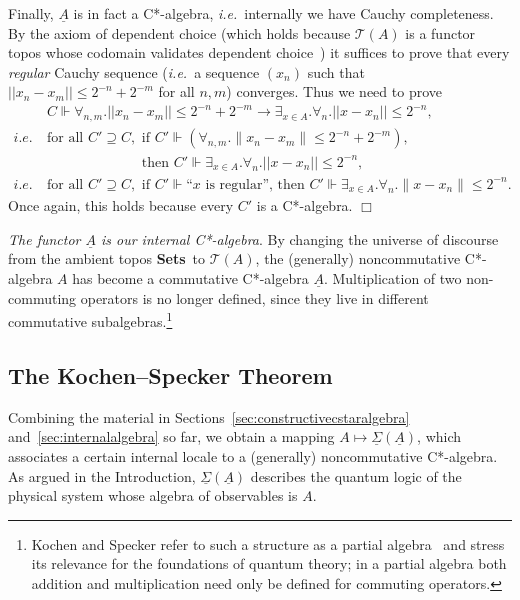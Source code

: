 \documentclass[12pt]{article}
\newcommand{\Sets}{\mbox{\textbf{Sets}}}
\newcommand{\ca}{C*-algebra} \newcommand{\jba}{JB-algebra}
\newcommand{\alg}[1]{\ensuremath{#1}}
\newcommand{\functor}[1]{\ensuremath{\underline{#1}}}
\newcommand{\asstopos}{\ensuremath{\mathcal{T}}}
\newcommand{\uA}{\underline{A}}
\newcommand{\TA}{\mathcal{T}(A)}
\newcommand{\ie}{\textit{i.e.}}
\newcommand{\ulS}{\functor{\Sigma}}
\renewcommand{\TA}{\asstopos(\alg{A})}
\newenvironment{proof}[1][Proof]%
{ \begin{trivlist}%
  \item[\hskip \labelsep {\bfseries #1}]%
}%
{ \end{trivlist}%
}
\newcommand{\qed}{\nobreak\hfill$\Box$}
\begin{document}
\begin{proof}
  Finally, $\functor{\alg{A}}$ is in fact a C*-algebra, \ie\ internally
  we have Cauchy completeness. By the axiom of dependent choice
  (which holds because $\TA$ is a functor topos whose codomain
 validates   dependent choice~\cite{fourmanscedrov82})
   it
  suffices to prove that every \emph{regular} Cauchy sequence (\ie\
 a sequence $(x_n)$ such that
  $||x_n-x_m||\leqslant 2^{-n}+2^{-m}$ for all $n,m$)   converges. Thus we need to
prove
  \begin{align*}
     & C\Vdash \forall_{n,m}. ||x_n-x_m||\leqslant
2^{-n}+2^{-m}\rightarrow \exists_{x\in
       A}. \forall_n. ||x-x_n||\leqslant 2^{-n}, \\
     \ie\ & \mbox{for all }C'\supseteq C, \mbox{ if }C'\Vdash (\forall_{n,m}.
           \|x_n-x_m\|\leqslant 2^{-n}+2^{-m}), \\
         & \phantom{\mbox{for all }C'\supseteq C, }\mbox{ then }C'\Vdash
           \exists_{x\in A}. \forall_n.||x-x_n||\leqslant 2^{-n}, \\
     \ie\ & \mbox{for all }C'\supseteq C, \mbox{ if }C'\Vdash\mbox{``$x$ is
           regular'', then } C'\Vdash\exists_{x\in
           A}. \forall_n.\|x-x_n\|\leqslant 2^{-n}.
  \end{align*}
 Once again, this holds because every $C'$ is a C*-algebra.
  \qed
\end{proof}

\emph{The functor $\functor{\alg{A}}$ is our internal
C*-algebra}. By changing the universe of discourse from the ambient
topos \Sets\ to $\asstopos(\alg{A})$, the (generally) noncommutative
C*-algebra $\alg{A}$ has become a commutative C*-algebra $\functor{\alg{A}}$.
Multiplication of two non-commuting operators is no longer
defined, since they live in different commutative subalgebras.\footnote{Kochen
and Specker refer to such a structure as a partial
algebra~\cite{kochenspecker67} and stress its relevance for
the foundations of quantum theory; in a partial algebra both  addition
and multiplication need only be defined for commuting operators.}
\subsection{The Kochen--Specker Theorem}
\label{sec:spectrum}
Combining the material in Sections~\ref{sec:constructivecstaralgebra}
and~\ref{sec:internalalgebra} so far,
we obtain a mapping $A\mapsto\ulS(\uA)$, which associates a certain internal
locale
to a (generally) noncommutative \ca. As argued in the Introduction,  $\ulS(\uA)$
describes the quantum logic of the physical system whose algebra of observables
is $A$.
\end{document}
